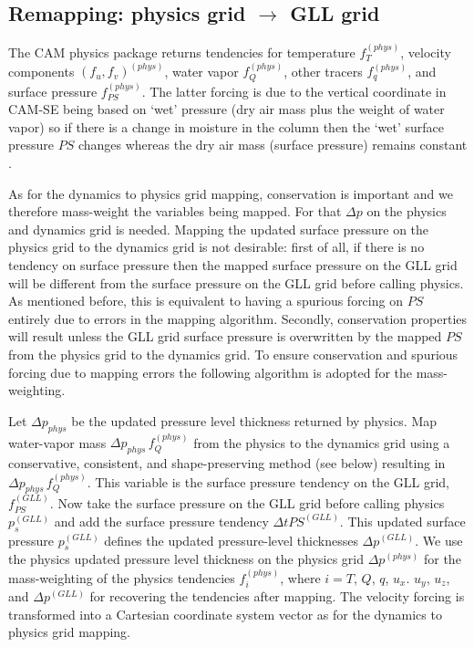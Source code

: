 \subsection{Remapping: physics grid $\rightarrow$ GLL grid}
The CAM physics package returns tendencies for temperature $f_T^{(phys)}$, velocity components $(f_u,f_v)^{(phys)}$, water vapor $f_Q^{(phys)}$, other tracers $f_q^{(phys)}$, and surface pressure $f_{PS}^{(phys)}$. The latter forcing is due to the vertical coordinate in CAM-SE being based on `wet' pressure (dry air mass plus the weight of water vapor) so if there is a change in moisture in the column then the `wet' surface pressure  $PS$ changes whereas the dry air mass (surface pressure) remains constant \citep[see section 3.1.8 `Adjustment of pressure to include change in mass of water vapor' in ][]{CAM5}. 

As for the dynamics to physics grid mapping, conservation is important and we therefore mass-weight the variables being mapped. For that $\Delta p$ on the physics and dynamics grid is needed. Mapping the updated surface pressure on the physics grid to the dynamics grid is not desirable: first of all, if there is no tendency on surface pressure then the mapped surface pressure on the GLL grid will be different from the surface pressure on the GLL grid before calling physics. As mentioned before, this is equivalent to having a spurious forcing on $PS$ entirely due to errors in the mapping algorithm. Secondly, conservation properties will result unless the GLL grid surface pressure is overwritten by the mapped $PS$ from the physics grid to the dynamics grid. To ensure conservation and spurious forcing due to mapping errors the following algorithm is adopted for the mass-weighting.

Let $\Delta p_{phys}$ be the updated pressure level thickness returned by physics. Map water-vapor mass $\Delta p_{phys}\, f_Q^{(phys)}$ from the physics to the dynamics grid using a conservative, consistent, and shape-preserving method (see below) resulting in $\Delta p_{phys}\, f_Q^{(phys)}$. This variable is the surface pressure tendency on the GLL grid, $f_{PS}^{(GLL)}$. Now take the surface pressure on the GLL grid before calling physics $p_s^{(GLL)}$ and add the surface pressure tendency $\Delta t PS^{(GLL)}$. This updated surface pressure $p_s^{(GLL)}$ defines the updated pressure-level thicknesses $\Delta p^{(GLL)}$. We use the physics updated pressure level thickness on the physics grid $\Delta p^{(phys)}$ for the mass-weighting of the physics tendencies $f^{(phys)}_i$, where $i=T$, $Q$, $q$, $u_x$. $u_y$, $u_z$, and $\Delta p^{(GLL)}$ for recovering the tendencies after mapping. The velocity forcing is transformed into a Cartesian coordinate system vector as for the dynamics to physics grid mapping.

